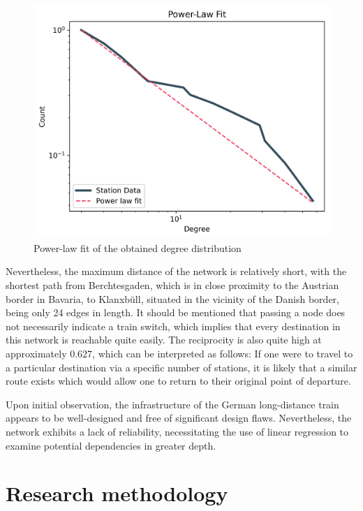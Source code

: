 \documentclass[12pt,a4paper]{article}
\begin{document}
\begin{figure}[!h]
  \includegraphics[clip=true,width=\columnwidth]{../data/visualizations/powerlaw_fit.png}
  \caption{Power-law fit of the obtained degree distribution}
   \label{fig:network-powerlaw}
\end{figure}

Nevertheless, the maximum distance of the network is relatively short, with the shortest path from Berchtesgaden, which is in close proximity to the Austrian border in Bavaria, to Klanxbüll, situated in the vicinity of the Danish border, being only 24 edges in length. 
It should be mentioned that passing a node does not necessarily indicate a train switch, which implies that every destination in this network is reachable quite easily. The reciprocity is also quite high at approximately 0.627, which can be interpreted as follows: If one were to travel to a particular destination via a specific number of stations, it is likely that a similar route exists which would allow one to return to their original point of departure. 

Upon initial observation, the infrastructure of the German long-distance train appears to be well-designed and free of significant design flaws. Nevertheless, the network exhibits a lack of reliability, necessitating the use of linear regression to examine potential dependencies in greater depth.
\maketitle
\section{\label{sec:Research methodology}Research methodology}
\end{document}
